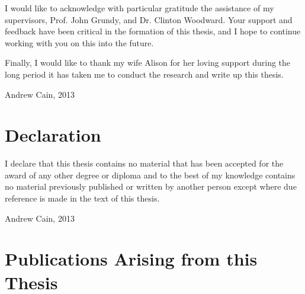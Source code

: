 I would like to acknowledge with particular gratitude the assistance of my supervisors, Prof. John Grundy, and Dr. Clinton Woodward. Your support and feedback have been critical in the formation of this thesis, and I hope to continue working with you on this into the future.

Finally, I would like to thank my wife Alison for her loving support during the long period it has taken me to conduct the research and write up this thesis.

\vspace*{2cm}
Andrew Cain, 2013


\chapter*{Declaration}
I declare that this thesis contains no material that has been accepted for the award of any other degree or diploma and to the best of my knowledge contains no material previously published or written by another person except where due reference is made in the text of this thesis.

\vspace*{4cm} Andrew Cain, 2013
\chapter*{Publications Arising from this Thesis}
\vspace{-0.5cm}

